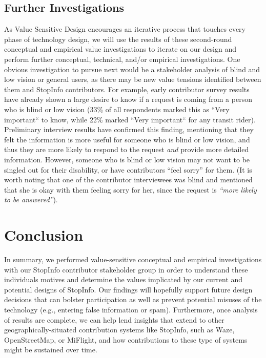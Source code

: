 \subsection{Further Investigations}
As Value Sensitive Design encourages an iterative process that touches every phase of technology design, we will use the results of these second-round conceptual and empirical value investigations to iterate on our design and perform further conceptual, technical, and/or empirical investigations. One obvious investigation to pursue next would be a stakeholder analysis of blind and low vision or general users, as there may be new value tensions identified between them and StopInfo contributors. For example, early contributor survey results have already shown a large desire to know if a request is coming from a person who is blind or low vision (33\% of all respondents marked this as ``Very important`` to know, while 22\% marked ``Very important`` for any transit rider). Preliminary interview results have confirmed this finding, mentioning that they felt the information is more useful for someone who is blind or low vision, and thus they are more likely to respond to the request \emph{and} provide more detailed information. However, someone who is blind or low vision may not want to be singled out for their disability, or have contributors ``feel sorry'' for them. (It is worth noting that one of the contributor interviewees was blind and mentioned that she is okay with them feeling sorry for her, since the request is \emph{``more likely to be answered''}). 

\section{Conclusion}
In summary, we performed value-sensitive conceptual and empirical investigations with our StopInfo contributor stakeholder group in order to understand these individuals motives and determine the values implicated by our current and potential designs of StopInfo. Our findings will hopefully support future design decisions that can bolster participation as well as prevent potential misuses of the technology (e.g., entering false information or spam). Furthermore, once analysis of results are complete, we can help lend insights that extend to other geographically-situated contribution systems like StopInfo, such as Waze, OpenStreetMap, or MiFlight, and how contributions to these type of systems might be sustained over time.  